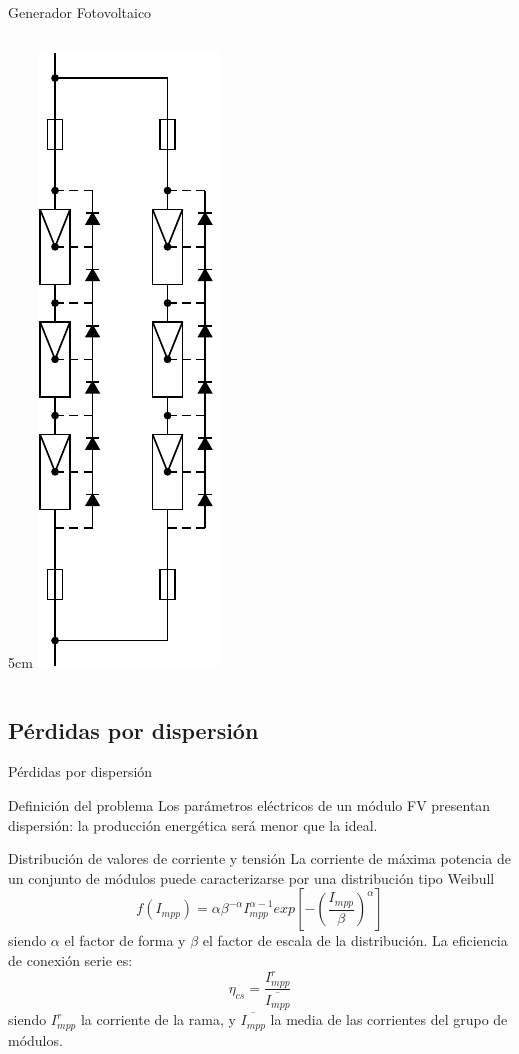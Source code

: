 \documentclass[xcolor={usenames,svgnames,dvipsnames}]{beamer}
\begin{document}
\begin{frame}[label=sec-2-1-1]{Generador Fotovoltaico}
\begin{columns}
\begin{column}{5cm\textwidth}
\includegraphics[height=0.9\textheight]{../figs/AsociacionModulos.pdf}
\end{column}
\end{columns}
\end{frame}

\subsection{Pérdidas por dispersión}
\label{sec-2-2}

\begin{frame}[label=sec-2-2-1]{Pérdidas por dispersión}
\begin{block}{Definición del problema}
Los parámetros eléctricos de un módulo FV presentan dispersión: la producción energética será menor que la ideal.
\end{block}
\end{frame}

\begin{frame}[label=sec-2-2-2]{Distribución de valores de corriente y tensión}
La corriente de máxima potencia de un conjunto de módulos puede caracterizarse por una distribución tipo
Weibull$$f(I_{mpp})=\alpha\beta^{-\alpha}I_{mpp}^{\alpha-1}exp\left[-\left(\frac{I_{mpp}}{\beta}\right)^{\alpha}\right]$$
siendo $\alpha$ el factor de forma y $\beta$ el factor de escala de la distribución. La eficiencia de conexión serie
es:$$\eta_{cs}=\frac{I_{mpp}^{r}}{\overline{I_{mpp}}}$$ siendo $I_{mpp}^{r}$ la corriente de la rama, y $\overline{I_{mpp}}$ la media
de las corrientes del grupo de módulos.
\end{frame}
\end{document}
